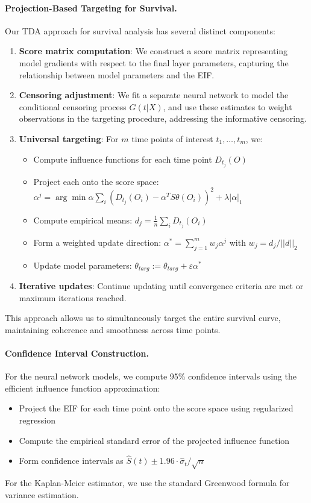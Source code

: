 \documentclass{article}
\theoremstyle{remark}
\begin{document}
\paragraph{Projection-Based Targeting for Survival.}
Our TDA approach for survival analysis has several distinct components:
\begin{enumerate}[leftmargin=15pt]
\item \textbf{Score matrix computation}: We construct a score matrix representing model gradients with respect to the final layer parameters, capturing the relationship between model parameters and the EIF.
\item \textbf{Censoring adjustment}: We fit a separate neural network to model the conditional censoring process $G(t|X)$, and use these estimates to weight observations in the targeting procedure, addressing the informative censoring.
\item \textbf{Universal targeting}: For $m$ time points of interest ${t_1, \ldots, t_m}$, we:
\begin{itemize}
\item Compute influence functions for each time point $D_{t_j}(O)$
\item Project each onto the score space: $\alpha^j = \arg\min\alpha \sum_i (D_{t_j}(O_i) - \alpha^T S{\theta}(O_i))^2 + \lambda|\alpha|_1$
\item Compute empirical means: $d_j = \frac{1}{n}\sum_i D_{t_j}(O_i)$
\item Form a weighted update direction: $\alpha^* = \sum_{j=1}^m w_j \alpha^j$ with $w_j = d_j / ||d||_2$
\item Update model parameters: $\theta_{targ} := \theta_{targ} + \varepsilon\alpha^*$
\end{itemize}
\item \textbf{Iterative updates}: Continue updating until convergence criteria are met or maximum iterations reached.
\end{enumerate}
This approach allows us to simultaneously target the entire survival curve, maintaining coherence and smoothness across time points.
\paragraph{Confidence Interval Construction.}
For the neural network models, we compute 95\% confidence intervals using the efficient influence function approximation:
\begin{itemize}[leftmargin=15pt]
\item Project the EIF for each time point onto the score space using regularized regression
\item Compute the empirical standard error of the projected influence function
\item Form confidence intervals as $\hat{S}(t) \pm 1.96 \cdot \hat{\sigma}_t / \sqrt{n}$
\end{itemize}
For the Kaplan-Meier estimator, we use the standard Greenwood formula for variance estimation.
\end{document}
